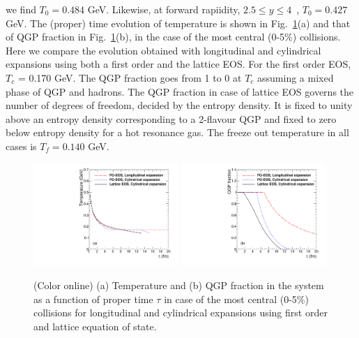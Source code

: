 {{    we find $T_0 = 0.484$ GeV.  Likewise, at forward rapiidity, $2.5 \leq y \leq 4$~\cite{Abbas:2013bpa}, 
    $T_0 = 0.427$ GeV.}
  The (proper) time evolution of temperature is shown in Fig.~\ref{fig:TauVsTemp}(a) 
  and that of QGP fraction in Fig.~\ref{fig:TauVsTemp}(b), in the case of the most central (0-5$\%$) collisions.
  Here we compare the evolution obtained with longitudinal and cylindrical expansions using 
  both a first order and the lattice EOS. 
  For the first order EOS, $T_c$ = 0.170 GeV. The QGP fraction goes from 1 to 0 at $T_c$ 
  assuming a mixed phase of QGP and hadrons. The QGP fraction in case of lattice EOS governs the 
  number of degrees of freedom, decided by the entropy density. It is fixed to unity above an entropy density 
  corresponding to a 2-flavour QGP and fixed to zero below entropy density for a hot 
  resonance gas. The freeze out temperature in all cases is $T_f=0.140$ GeV.  
  
  \begin{figure}
    \includegraphics[width=0.49\textwidth]{Figures/Quarkonia_276TeV/Fig1a_TauVsTemp.pdf}
    \includegraphics[width=0.49\textwidth]{Figures/Quarkonia_276TeV/Fig1b_TauVsFQGP.pdf}
    \caption{(Color online) (a) Temperature and (b) QGP fraction in the system as a function of proper 
      time $\tau$ in case of the most central (0-5$\%$) collisions for longitudinal and cylindrical expansions 
      using first order and lattice equation of state.}
    \label{fig:TauVsTemp}
  \end{figure}
}
